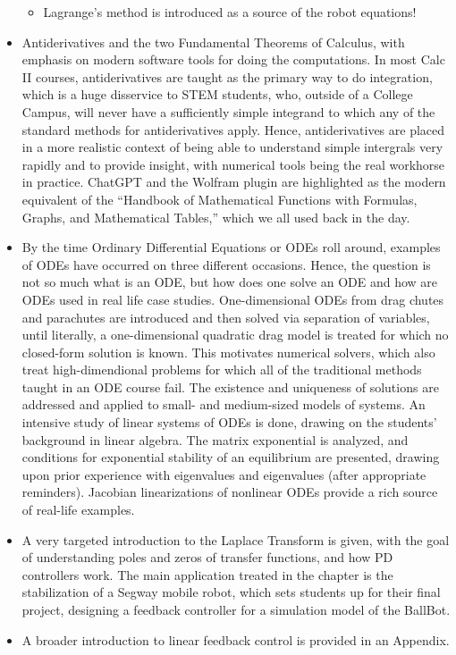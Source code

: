 \begin{itemize}
\begin{itemize}
        \item Lagrange's method is introduced as a source of the robot equations! 
    \end{itemize}
    \item Antiderivatives and the two Fundamental Theorems of Calculus, with emphasis on modern software tools for doing the computations. In most Calc II courses, antiderivatives are taught as the primary way to do integration, which is a huge disservice to STEM students, who, outside of a College Campus, will never have a sufficiently simple integrand to which any of the standard methods for antiderivatives apply. Hence, antiderivatives are placed in a more realistic context of being able to understand simple intergrals very rapidly and to provide insight, with numerical tools being the real workhorse in practice. ChatGPT and the Wolfram plugin are highlighted as the modern equivalent of the ``Handbook of Mathematical Functions with Formulas, Graphs, and Mathematical Tables,'' which we all used back in the day. 
    \item By the time Ordinary Differential Equations or ODEs roll around, examples of ODEs have occurred on three different occasions. Hence, the question is not so much what is an ODE, but how does one solve an ODE and how are ODEs used in real life case studies. One-dimensional ODEs from drag chutes and parachutes are introduced and then solved via separation of variables, until literally, a one-dimensional quadratic drag model is treated for which no closed-form solution is known. This motivates numerical solvers, which also treat high-dimendional problems for which all of the traditional methods taught in an ODE course fail. The existence and uniqueness of solutions are addressed and applied to small- and medium-sized models of systems. An intensive study of linear systems of ODEs is done, drawing on the students' background in linear algebra. The matrix exponential is analyzed, and conditions for exponential stability of an equilibrium are presented, drawing upon prior experience with eigenvalues and eigenvalues (after appropriate reminders). Jacobian linearizations of nonlinear ODEs provide a rich source of real-life examples.
    \item A very targeted introduction to the Laplace Transform is given, with the goal of understanding poles and zeros of transfer functions, and how PD controllers work. The main application treated in the chapter is the stabilization of a Segway mobile robot, which sets students up for their final project, designing a feedback controller for a simulation model of the BallBot. 
    \item A broader introduction to linear feedback control is provided in an Appendix. 
\end{itemize} 

